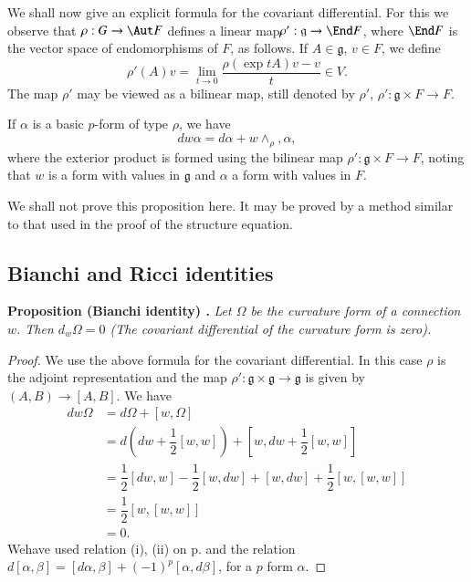We shall now give an explicit formula for the covariant differential. For this we observe that $\rho:G\to \Aut F$ defines a linear map\pageoriginale $\rho':\mathfrak{g}\to \End F$, where $\End F$ is the vector space of endomorphisms of $F$, as follows. If $A\in \mathfrak{g}$, $v\in F$, we define
$$
\rho'(A)v=\lim\limits_{t\to 0}\dfrac{\rho(\exp tA)v-v}{t}\in V.
$$
The map $\rho'$ may be viewed as a bilinear map, still denoted by $\rho'$, $\rho':\mathfrak{g}\times F\to F$.

\begin{proposition}\label{sec12-prop12.5}
If $\alpha$ is a basic $p$-form of type $\rho$, we have
$$
dw\alpha=d\alpha+w\wedge_{\rho}, \alpha,
$$
where the exterior product is formed using the bilinear map $\rho':\mathfrak{g}\times F\to F$, noting that $w$ is a form with values in $\mathfrak{g}$ and $\alpha$ a form with values in $F$.
\end{proposition}

We shall not prove this proposition here. It may be proved by a method similar to that used in the proof of the structure equation.

\subsection*{Bianchi and Ricci identities}

\noindent
{\bf Proposition (Bianchi identity) .\label{sec12-prop12.6}}
{\em Let $\Omega$ be the curvature form of a connection $w$. Then $d_{w}\Omega=0$ (The covariant differential of the curvature form is zero).}

\begin{proof}
We use the above formula for the covariant differential. In this case $\rho$ is the adjoint representation and the map $\rho':\mathfrak{g}\times \mathfrak{g}\to \mathfrak{g}$ is given by $(A,B)\to [A,B]$. We have
\begin{align*}
dw\Omega &= d\Omega+[w,\Omega]\\[3pt]
         &= d\left(dw+\dfrac{1}{2}[w,w]\right)+\left[w,dw+\dfrac{1}{2}[w,w]\right]\\[3pt]
         &= \dfrac{1}{2}[dw,w]-\dfrac{1}{2}[w,dw]+[w,dw]+\dfrac{1}{2}[w,[w,w]]\\[3pt]
         &= \dfrac{1}{2}[w,[w,w]]\\[3pt]
         &= 0.
\end{align*}
We\pageoriginale have used relation (i), (ii) on p.\pageref{page50} and the relation $d[\alpha,\beta]=[d\alpha,\beta]+(-1)^{p}[\alpha,d\beta]$, for a $p$ form $\alpha$.
\end{proof}

